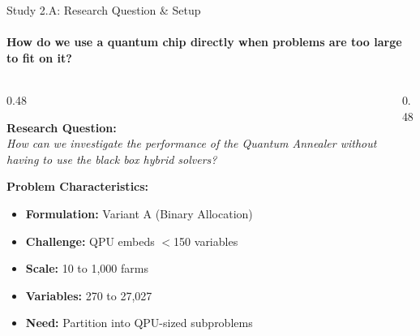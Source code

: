 \documentclass[aspectratio=169,10pt]{beamer}
\begin{document}
\begin{frame}{Study 2.A: Research Question \& Setup}
    \framesubtitle{How do we use a quantum chip directly when problems are too large to fit on it?}
    
    \begin{columns}[T]
        \begin{column}{0.48\textwidth}
            \begin{keybox}
                \centering\small
                \textbf{Research Question:}\\[4pt]
                \textit{How can we investigate the performance of the Quantum Annealer without having to use the black box hybrid solvers?}
            \end{keybox}
            
            \vspace{0.3cm}
            \small\textbf{Problem Characteristics:}
            \begin{itemize}\scriptsize
                \item \textbf{Formulation:} Variant A (Binary Allocation)
                \item \textbf{Challenge:} QPU embeds $<$150 variables
                \item \textbf{Scale:} 10 to 1,000 farms
                \item \textbf{Variables:} 270 to 27,027
                \item \textbf{Need:} Partition into QPU-sized subproblems
            \end{itemize}
        \end{column}
        
        \begin{column}{0.48\textwidth}
            

\end{column}
\end{columns}
\end{frame}
\end{document}
